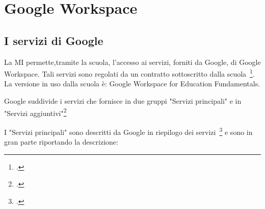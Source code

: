 \chapter{Google Workspace}
\section{I servizi di Google}
La MI permette,tramite la scuola, l'accesso ai servizi, forniti da \textenglish{Google}, di \textenglish{Google Workspace}. Tali servizi sono regolati da un contratto sottoscritto dalla scuola~\footcite{Google2020}. La versione in uso dalla scuola è:  \textenglish{Google Workspace for Education Fundamentals}.

\textenglish{Google} suddivide i servizi che fornisce in due gruppi "Servizi principali" e in "Servizi aggiuntivi"\footcite{Google2021a}

I "Servizi principali" sono  descritti da \textenglish{Google} in riepilogo dei servizi~\footcite{Google2022d} e sono in gran parte riportando la descrizione:

